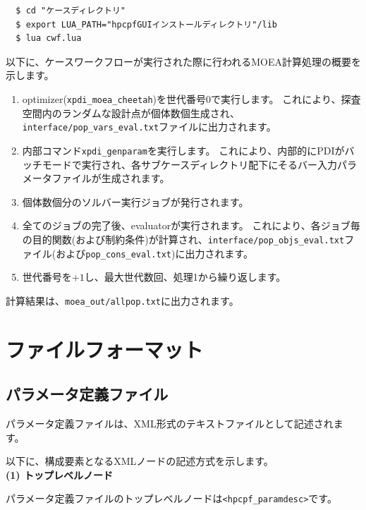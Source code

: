 \documentclass[a4paper,11pt]{jarticle}
\begin{document}
{\begin{verbatim}
  $ cd "ケースディレクトリ"
  $ export LUA_PATH="hpcpfGUIインストールディレクトリ"/lib
  $ lua cwf.lua
\end{verbatim}

以下に、ケースワークフローが実行された際に行われるMOEA計算処理の概要を示します。

\begin{enumerate}
\item optimizer({\tt xpdi\_moea\_cheetah})を世代番号0で実行します。
これにより、探査空間内のランダムな設計点が個体数個生成され、{\tt interface/pop\_vars\_eval.txt}ファイルに出力されます。

\item 内部コマンド{\tt xpdi\_genparam}を実行します。
これにより、内部的にPDIがバッチモードで実行され、各サブケースディレクトリ配下にそるバー入力パラメータファイルが生成されます。

\item 個体数個分のソルバー実行ジョブが発行されます。

\item 全てのジョブの完了後、evaluatorが実行されます。
これにより、各ジョブ毎の目的関数(および制約条件)が計算され、{\tt interface/pop\_objs\_eval.txt}ファイル(および{\tt pop\_cons\_eval.txt})に出力されます。

\item 世代番号を$+1$し、最大世代数回、処理1から繰り返します。
\end{enumerate}

計算結果は、{\tt moea\_out/allpop.txt}に出力されます。


\newpage
\section{ファイルフォーマット}

\subsection{パラメータ定義ファイル}

パラメータ定義ファイルは、XML形式のテキストファイルとして記述されます。

以下に、構成要素となるXMLノードの記述方式を示します。\\

\textbf{(1) トップレベルノード}

パラメータ定義ファイルのトップレベルノードは\texttt{<hpcpf\_paramdesc>}です。

}
\end{document}
